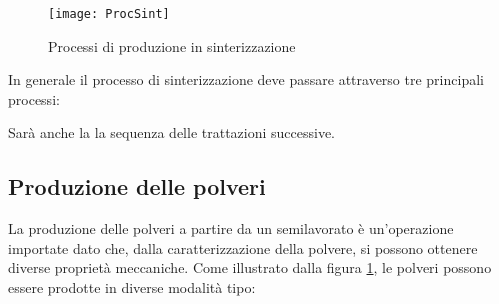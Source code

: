 \begin{figure}
\centering
\texttt{[image: ProcSint]}
\caption{Processi di produzione in sinterizzazione}
\label{fig:ProcSint}
\end{figure}

In generale il processo di sinterizzazione deve passare attraverso 
tre principali processi:

\begin{center}
\end{center}

Sarà anche la la sequenza delle trattazioni successive.

\subsection{Produzione delle polveri}
La produzione delle polveri a partire da un semilavorato è un'operazione importate dato che, dalla caratterizzazione della polvere, si possono ottenere diverse proprietà meccaniche.
Come illustrato dalla figura \ref{fig:ProcSint}, le polveri possono essere prodotte in diverse modalità tipo:
